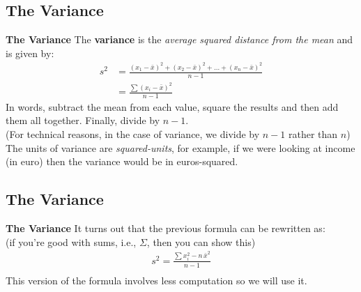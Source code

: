 \documentclass[compress]{beamer}        %
\makeatletter
\newcommand{\tcb}{\textcolor{beamer@blendedblue}}
\makeatother
\begin{document}
\subsection{The Variance}
\begin{frame}{\bf \tcb{The Variance}}
The {\bf variance} is the \emph{average squared distance from the mean} and is given by:\\[-0.6cm]
\begin{align*}
s^2 &= \frac{(x_1 - \bar x)^2 + (x_2 - \bar x)^2 + \ldots + (x_n - \bar x)^2}{n-1}\\[0.2cm]
&= \frac{\sum (x_i - \bar x)^2}{n-1}
\end{align*}
In words, subtract the mean from each value, square the results and then add them all together. Finally, divide by $n-1$.\\
{\footnotesize(For technical reasons, in the case of variance, we divide by $n-1$ rather than $n$)}\\[0.7cm]
The units of variance are \emph{squared-units}, for example, if we were looking at income (in euro) then the variance would be in euros-squared.


\end{frame}

\subsection{The Variance}
\begin{frame}{\bf \tcb{The Variance}}
It turns out that the previous formula can be rewritten as:\\
{\footnotesize(if you're good with sums, i.e., $\Sigma$, then you can show this)}\\[0.2cm]
\begin{align*}
\boxed{s^2 = \frac{\sum x_i^2 - n\,{\bar x}^2}{n-1}}\\
\end{align*}
This version of the formula involves less computation so we will use it.\\[0.5cm]


\end{frame}
\end{document}
